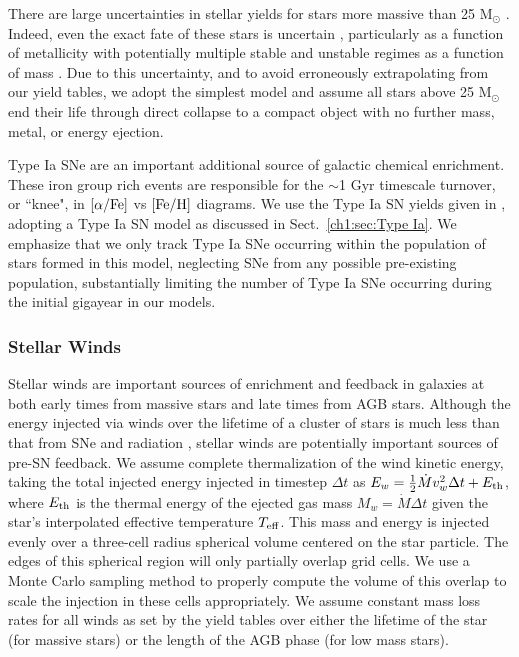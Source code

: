 There are large uncertainties in stellar yields for stars more massive than 25 M$_{\odot}$ \citep[see ][and references therein]{Cote2016}. Indeed, even the exact fate of these stars is uncertain \citep[e.g.][]{Woosley2002,Zhang2008,Ugliano2012}, particularly as a function of metallicity \citep{Fryer2012} with potentially multiple stable and unstable regimes as a function of mass \citep{Heger2003}. Due to this uncertainty, and to avoid erroneously extrapolating from our yield tables, we adopt the simplest model and assume all stars above 25 M$_{\odot}$ end their life through direct collapse to a compact object with no further mass, metal, or energy ejection.

Type Ia SNe are an important additional source of galactic chemical enrichment. These iron group rich events are responsible for the $\sim$1 Gyr timescale turnover, or ``knee", in $[\alpha/\rm{Fe}]$ vs $[\rm{Fe}/\rm{H}]$ diagrams. We use the Type Ia SN yields given in \citet{Thielemann1986}, adopting a Type Ia SN model as discussed in Sect.~\ref{ch1:sec:Type Ia}. We emphasize that we only track Type Ia SNe occurring within the population of stars formed in this model, neglecting SNe from any possible pre-existing population, substantially limiting the number of Type Ia SNe occurring during the initial gigayear in our models.

\subsubsection{Stellar Winds}
\label{ch1:sec:stellar winds}
Stellar winds are important sources of enrichment and feedback in galaxies at both early times from massive stars and late times from AGB stars. Although the energy injected via winds over the lifetime of a cluster of stars is much less than that from SNe and radiation \citep{Shull1995}, stellar winds are potentially important sources of pre-SN feedback. We assume complete thermalization of the wind kinetic energy, taking the total injected energy injected in timestep $\Delta t$ as $E_w = \frac{1}{2}\dot{M}  v^2_w\Delta t  + E_{\rm th}$, where $E_{\rm th}$ is the thermal energy of the ejected gas mass $M_w = \dot{M}\Delta t$ given the star's interpolated effective temperature $T_{\rm eff}$. This mass and energy is injected evenly over a three-cell radius spherical volume centered on the star particle. The edges of this spherical region will only partially overlap grid cells. We use a Monte Carlo sampling method to properly compute the volume of this overlap to scale the injection in these cells appropriately. We assume constant mass loss rates for all winds as set by the yield tables over either the lifetime of the star (for massive stars) or the length of the AGB phase (for low mass stars).

